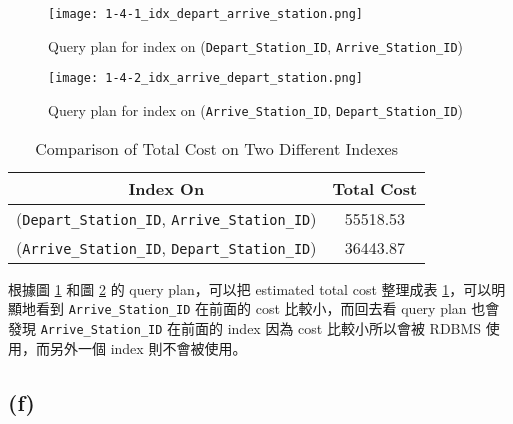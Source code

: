 \documentclass{article}
\begin{document}
\begin{figure}[H]
    \centering
    \texttt{[image: 1-4-1\_idx\_depart\_arrive\_station.png]}
    \caption{Query plan for index on (\texttt{Depart\_Station\_ID}, \texttt{Arrive\_Station\_ID})}
    \label{fig:1-4-1_idx_depart_arrive_station}
\end{figure}

\begin{figure}[H]
    \centering
    \texttt{[image: 1-4-2\_idx\_arrive\_depart\_station.png]}
    \caption{Query plan for index on (\texttt{Arrive\_Station\_ID}, \texttt{Depart\_Station\_ID})}
    \label{fig:1-4-2_idx_arrive_depart_station}
\end{figure}

\begin{table}[H]
    \centering
    \begin{tabular}{cc}
        \toprule
        \textbf{Index On} & \textbf{Total Cost} \\
        \midrule
        (\texttt{Depart\_Station\_ID}, \texttt{Arrive\_Station\_ID}) & 55518.53 \\
        (\texttt{Arrive\_Station\_ID}, \texttt{Depart\_Station\_ID}) & 36443.87 \\
        \bottomrule
    \end{tabular}
    \caption{Comparison of Total Cost on Two Different Indexes}
    \label{tab:index-comparison}
\end{table}
根據圖 \ref{fig:1-4-1_idx_depart_arrive_station} 和圖 \ref{fig:1-4-2_idx_arrive_depart_station} 的 query plan，可以把 estimated total cost 整理成表 \ref{tab:index-comparison}，可以明顯地看到 \texttt{Arrive\_Station\_ID} 在前面的 cost 比較小，而回去看 query plan 也會發現 \texttt{Arrive\_Station\_ID} 在前面的 index 因為 cost 比較小所以會被 RDBMS 使用，而另外一個 index 則不會被使用。

\subsection*{(f)}
\end{document}
